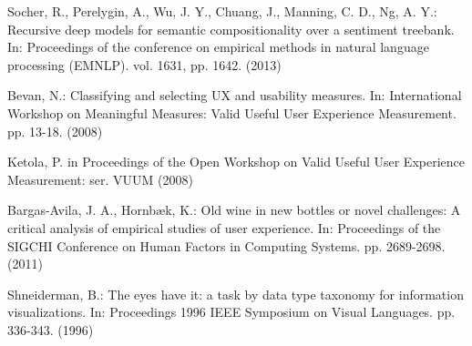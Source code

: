 \documentclass[a4paper,10pt, bibliography=totocnumbered]{scrreprt}
\begin{document}
\begin{thebibliography}{9}
 Socher, R., Perelygin, A., Wu, J. Y., Chuang, J., Manning, C. D., Ng, A. Y.: Recursive deep models for semantic compositionality over a sentiment treebank.
In: Proceedings of the conference on empirical methods in natural language processing (EMNLP). vol. 1631, pp. 1642. (2013)

 Bevan, N.: Classifying and selecting UX and usability measures.
In: International Workshop on Meaningful Measures: Valid Useful User Experience Measurement. pp. 13-18. (2008)

 Ketola, P. in Proceedings of the Open Workshop on Valid Useful User Experience Measurement: ser. VUUM (2008)

 Bargas-Avila, J. A., Hornbæk, K.: Old wine in new bottles or novel challenges: A critical analysis of empirical studies of user experience.
In: Proceedings of the SIGCHI Conference on Human Factors in Computing Systems. pp. 2689-2698. (2011)

 Shneiderman, B.: The eyes have it: a task by data type taxonomy for information visualizations.
In: Proceedings 1996 IEEE Symposium on Visual Languages. pp. 336-343. (1996)

\end{thebibliography}

\listoffigures

\listoftables
\end{document}
